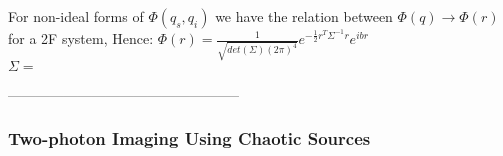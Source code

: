 For non-ideal forms of $\Phi (q_s,q_i)$ we have the relation between $\Phi (q) \rightarrow \Phi (r)$ for a 2F system, Hence: $\Phi(r)=\frac{1}{\sqrt{det(\Sigma)(2 \pi)^4}} e^{- \frac{1}{2} r^T \Sigma^{-1} r} e^{ibr}$ \\
$\Sigma=$


--------------------------------------------------
\subsubsection{Two-photon Imaging Using Chaotic Sources}